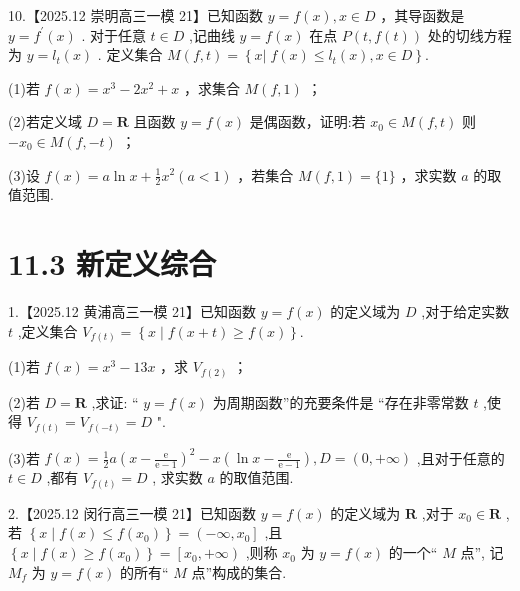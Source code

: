 \documentclass[10pt]{article}
\begin{document}
10.【2025.12 崇明高三一模 21】已知函数 \(y = f\left( x\right) ,x \in  D\) ，其导函数是 \(y = {f}^{\prime }\left( x\right)\) . 对于任意 \(t \in  D\) ,记曲线 \(y = f\left( x\right)\) 在点 \(P\left( {t,f\left( t\right) }\right)\) 处的切线方程为 \(y = {l}_{t}\left( x\right)\) . 定义集合 \(M\left( {f,t}\right)  = \left\{  {x\left| {\;f\left( x\right)  \leq  {l}_{t}\left( x\right) }\right. ,x \in  D}\right\}  .\)

(1)若 \(f\left( x\right)  = {x}^{3} - 2{x}^{2} + x\) ，求集合 \(M\left( {f,1}\right)\) ；

(2)若定义域 \(D = \mathbf{R}\) 且函数 \(y = f\left( x\right)\) 是偶函数，证明:若 \({x}_{0} \in  M\left( {f,t}\right)\) 则 \(- {x}_{0} \in  M\left( {f, - t}\right)\) ；

(3)设 \(f\left( x\right)  = a\ln x + \frac{1}{2}{x}^{2}\left( {a < 1}\right)\) ，若集合 \(M\left( {f,1}\right)  = \{ 1\}\) ，求实数 \(a\) 的取值范围.

\section*{11.3 新定义综合}

1.【2025.12 黄浦高三一模 21】已知函数 \(y = f\left( x\right)\) 的定义域为 \(D\) ,对于给定实数 \(t\) ,定义集合 \({V}_{f\left( t\right) } = \left\{  {x \mid  f\left( {x + t}\right)  \geq  f\left( x\right) }\right\}  .\)

(1)若 \(f\left( x\right)  = {x}^{3} - {13x}\) ，求 \({V}_{f\left( 2\right) }\) ；

(2)若 \(D = \mathbf{R}\) ,求证: “ \(y = f\left( x\right)\) 为周期函数”的充要条件是 “存在非零常数 \(t\) ,使得 \({V}_{f\left( t\right) } = {V}_{f\left( {-t}\right) } = D\) ".

(3)若 \(f\left( x\right)  = \frac{1}{2}a{\left( x - \frac{\mathrm{e}}{\mathrm{e} - 1}\right) }^{2} - x\left( {\ln x - \frac{\mathrm{e}}{\mathrm{e} - 1}}\right) ,D = \left( {0, + \infty }\right)\) ,且对于任意的 \(t \in  D\) ,都有 \({V}_{f\left( t\right) } = D\) , 求实数 \(a\) 的取值范围.

2.【2025.12 闵行高三一模 21】已知函数 \(y = f\left( x\right)\) 的定义域为 \(\mathbf{R}\) ,对于 \({x}_{0} \in  \mathbf{R}\) ,若 \(\left\{  {x \mid  f\left( x\right)  \leq  f\left( {x}_{0}\right) }\right\}   = \left( {-\infty ,{x}_{0}}\right\rbrack\) ,且 \(\left\{  {x \mid  f\left( x\right)  \geq  f\left( {x}_{0}\right) }\right\}   = \left\lbrack  {{x}_{0}, + \infty }\right)\) ,则称 \({x}_{0}\) 为 \(y = f\left( x\right)\) 的一个“ \(M\) 点”, 记 \({M}_{f}\) 为 \(y = f\left( x\right)\) 的所有“ \(M\) 点”构成的集合.
\end{document}

